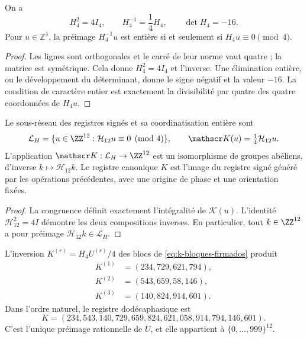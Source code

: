\begin{lemma}
\label{lem:k-hadamard}
On a
\[
 H_4^2=4I_4,\qquad H_4^{-1}=\frac14H_4,\qquad\det H_4=-16.
\]
Pour \(u\in\mathbb Z^4\), la préimage \(H_4^{-1}u\) est entière si et
seulement si \(H_4u\equiv0\pmod4\).
\end{lemma}

\begin{proof}
Les lignes sont orthogonales et le carré de leur norme vaut quatre ; la matrice est symétrique. Cela donne \(H_4^2=4I_4\) et l'inverse. Une élimination entière, ou le développement du déterminant, donne le signe négatif et la valeur \(-16\). La condition de caractère entier est exactement la divisibilité par quatre des quatre coordonnées de \(H_4u\).
\end{proof}

\begin{definition}
Le sous-réseau des registres signés et sa coordinatisation entière sont
\[
 \mathcal L_H=\{u\in\ZZ^{12}:\mathcal H_{12}u\equiv0\pmod4\},
 \qquad \mathscr K(u)=\tfrac14\mathcal H_{12}u.
\]
L'application \(\mathscr K:\mathcal L_H\to\ZZ^{12}\) est un isomorphisme
de groupes abéliens, d'inverse \(k\mapsto\mathcal H_{12}k\).
Le registre canonique \(K\) est l'image du registre signé généré
par les opérations précédentes, avec une origine de phase et une orientation fixées.
\end{definition}

\begin{proof}
La congruence définit exactement l'intégralité de \(\mathscr K(u)\).
L'identité \(\mathcal H_{12}^2=4I\) démontre les deux compositions
inverses. En particulier, tout \(k\in\ZZ^{12}\) a pour préimage
\(\mathcal H_{12}k\in\mathcal L_H\).
\end{proof}

\begin{proposition}
\label{prop:k-sello}
L'inversion \(K^{(r)}=H_4U^{(r)}/4\) des blocs de
\eqref{eq:k-bloques-firmados} produit
\begin{align*}
 K^{(1)}&=(234,729,621,794),\\
 K^{(2)}&=(543,659,58,146),\\
 K^{(3)}&=(140,824,914,601).
\end{align*}
Dans l'ordre naturel, le registre dodécaphasique est
\begin{equation}
 K=(234,543,140,729,659,824,621,058,914,794,146,601).
 \label{eq:k-vector}
\end{equation}
C'est l'unique préimage rationnelle de \(U\), et elle appartient à \(\{0,\ldots,999\}^{12}\).
\end{proposition}

